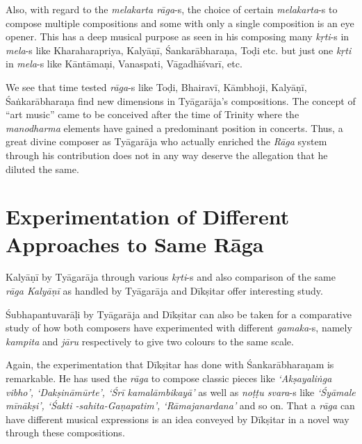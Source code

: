 Also, with regard to the \textit{melakarta rāga}-s, the choice of certain \textit{melakarta}-s to compose multiple compositions and some with only a single composition is an eye opener. This has a deep musical purpose as seen in his composing many \textit{kṛti}-s in \textit{mela}-s like Kharaharapriya, Kalyāṇī, Śankarābharaṇa, Toḍi etc. but just one \textit{kṛti} in \textit{mela}-s like Kāntāmaṇi, Vanaspati, Vāgadhīśvarī, etc.

We see that time tested \textit{rāga}-s like Toḍi, Bhairavī, Kāmbhoji, Kalyāṇī, Śaṅkarābharaṇa find new dimensions in Tyāgarāja’s compositions. The concept of “art music” came to be conceived after the time of Trinity where the \textit{manodharma} elements have gained a predominant position in concerts. Thus, a great divine composer as Tyāgarāja who actually enriched the \textit{Rāga} system through his contribution does not in any way deserve the allegation that he diluted the same.


\section*{Experimentation of Different Approaches to Same Rāga}

Kalyāṇī by Tyāgarāja through various \textit{kṛti}-s and also comparison of the same \textit{rāga Kalyāṇī} as handled by Tyāgarāja and Dīkṣitar offer interesting study.

Śubhapantuvarāḷi by Tyāgarāja and Dīkṣitar can also be taken for a comparative study of how both composers have experimented with different \textit{gamaka}-s, namely \textit{kampita} and \textit{jāru} respectively to give two colours to the same scale.

Again, the experimentation that Dīkṣitar has done with Śankarābhara\-ṇam is remarkable. He has used the \textit{rāga} to compose classic pieces like \textit{‘Akṣayaliṅga vibho’, ‘Dakṣināmūrte’, ‘Śrī kamalāmbikayā’} as well as \textit{noṭṭu svara}-s like \textit{‘Śyāmale mīnākṣi’, ‘Śakti -sahita-Gaṇapatim’, ‘Rāmajanardana’} and so on. That a \textit{rāga} can have different musical expressions is an idea conveyed by Dīkṣitar in a novel way through these compositions.

